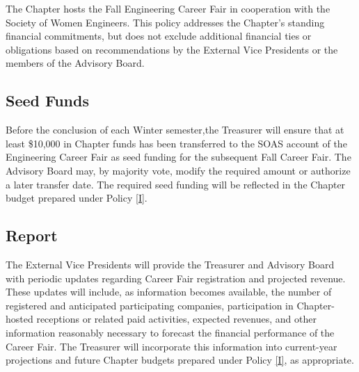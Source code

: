 The Chapter hosts the Fall Engineering Career Fair in cooperation with the Society of Women Engineers. 
This policy addresses the Chapter’s standing financial commitments, but does not exclude additional financial ties or obligations based on recommendations 
by the External Vice Presidents or the members of the Advisory Board.

\subsection{Seed Funds} \label{XI.1}
Before the conclusion of each Winter semester,the Treasurer will ensure that at least \$10,000 in Chapter funds has been transferred to the SOAS account of the 
Engineering Career Fair as seed funding for the subsequent Fall Career Fair. The Advisory Board may, by majority vote, modify the required amount or authorize a later transfer date. 
The required seed funding will be reflected in the Chapter budget prepared under Policy \ref{I}.

\subsection{Report} \label{XI.2}
The External Vice Presidents will provide the Treasurer and Advisory Board with periodic updates regarding Career Fair registration and projected revenue. 
These updates will include, as information becomes available, the number of registered and anticipated participating companies, participation in Chapter-hosted receptions or related paid activities, 
expected revenues, and other information reasonably necessary to forecast the financial performance of the Career Fair. 
The Treasurer will incorporate this information into current-year projections and future Chapter budgets prepared under Policy \ref{I}, as appropriate.